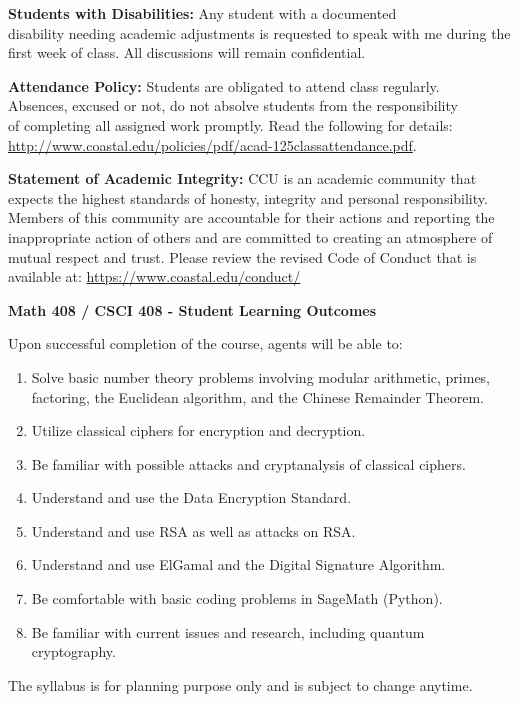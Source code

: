 \documentclass[10pt]{extarticle}
\begin{document}
\vspace{12 pt}
\noindent
\textbf{Students with Disabilities:}  Any student with a documented\\
disability needing academic adjustments is requested to speak with me during the\\
first week of class.  All discussions will remain confidential.

\vspace{10pt}

\noindent

\textbf{Attendance Policy:} Students are obligated to attend class regularly.\\
Absences, excused or not, do not absolve students from the responsibility\\
of completing all assigned work promptly. Read the following for details:\\
 \url{http://www.coastal.edu/policies/pdf/acad-125classattendance.pdf}.

\bigskip

\noindent
\textbf{Statement of Academic Integrity:} CCU is an academic community that\\
expects the highest standards of honesty, integrity and personal responsibility.\\
Members of  this community are accountable for their actions and reporting the\\
inappropriate action of others and are committed to creating an atmosphere of\\
mutual respect and trust. Please review the revised Code of Conduct that is\\
available at: \url{https://www.coastal.edu/conduct/}

\bigskip

\centerline{\bf Math 408 / CSCI 408 - Student Learning Outcomes}
Upon successful completion of the course, agents will be able to:

\vspace{.5cm}
\begin{enumerate}
\item Solve basic number theory problems involving modular arithmetic, primes,\\
factoring, the Euclidean algorithm, and the Chinese Remainder Theorem.
\item Utilize classical ciphers for encryption and decryption.
\item Be familiar with possible attacks and cryptanalysis of classical ciphers.
\item Understand and use the Data Encryption Standard.
\item Understand and use RSA as well as attacks on RSA.
\item Understand and use ElGamal and the Digital Signature Algorithm.
\item Be comfortable with basic coding problems in SageMath (Python).
\item Be familiar with current issues and research, including quantum cryptography.
\end{enumerate}

\vfill

\begin{center}
\footnotesize{The syllabus is for planning purpose only and is subject to change anytime.}
\end{center}
\newpage
\end{document}
